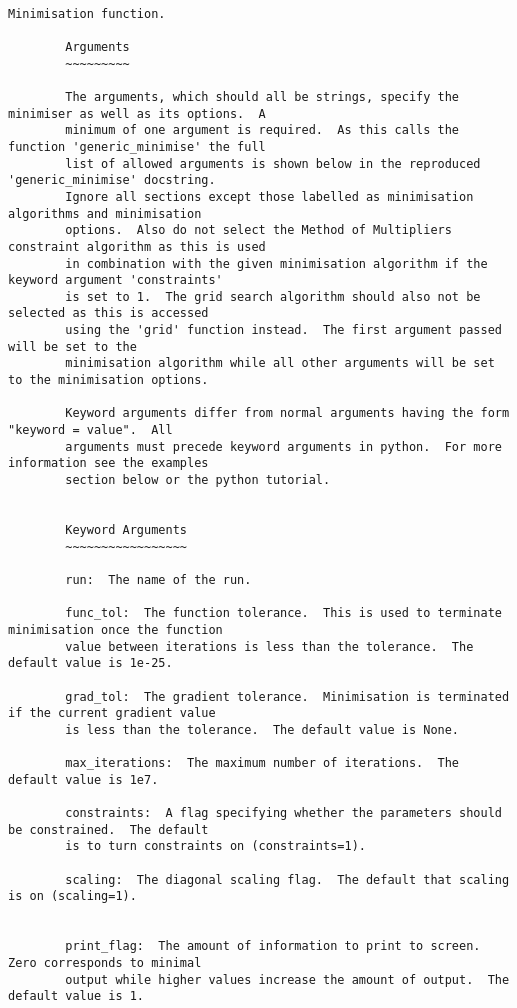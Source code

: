 \scriptsize
\begin{verbatim}

Minimisation function.

        Arguments
        ~~~~~~~~~

        The arguments, which should all be strings, specify the minimiser as well as its options.  A
        minimum of one argument is required.  As this calls the function 'generic_minimise' the full
        list of allowed arguments is shown below in the reproduced 'generic_minimise' docstring.
        Ignore all sections except those labelled as minimisation algorithms and minimisation
        options.  Also do not select the Method of Multipliers constraint algorithm as this is used
        in combination with the given minimisation algorithm if the keyword argument 'constraints'
        is set to 1.  The grid search algorithm should also not be selected as this is accessed
        using the 'grid' function instead.  The first argument passed will be set to the
        minimisation algorithm while all other arguments will be set to the minimisation options.

        Keyword arguments differ from normal arguments having the form "keyword = value".  All
        arguments must precede keyword arguments in python.  For more information see the examples
        section below or the python tutorial.


        Keyword Arguments
        ~~~~~~~~~~~~~~~~~

        run:  The name of the run.

        func_tol:  The function tolerance.  This is used to terminate minimisation once the function
        value between iterations is less than the tolerance.  The default value is 1e-25.

        grad_tol:  The gradient tolerance.  Minimisation is terminated if the current gradient value
        is less than the tolerance.  The default value is None.

        max_iterations:  The maximum number of iterations.  The default value is 1e7.

        constraints:  A flag specifying whether the parameters should be constrained.  The default
        is to turn constraints on (constraints=1).

        scaling:  The diagonal scaling flag.  The default that scaling is on (scaling=1).


        print_flag:  The amount of information to print to screen.  Zero corresponds to minimal
        output while higher values increase the amount of output.  The default value is 1.



\end{verbatim}
